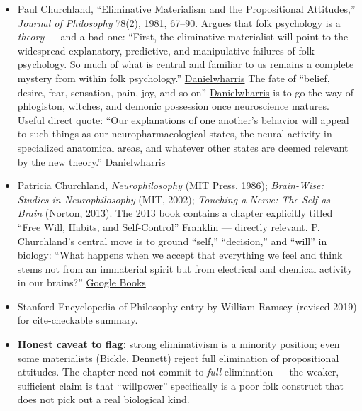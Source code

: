 \begin{itemize}
\tightlist
\item
  Paul Churchland, ``Eliminative Materialism and the Propositional Attitudes,'' \emph{Journal of Philosophy} 78(2), 1981, 67--90. Argues that folk psychology is a \emph{theory} --- and a bad one: ``First, the eliminative materialist will point to the widespread explanatory, predictive, and manipulative failures of folk psychology. So much of what is central and familiar to us remains a complete mystery from within folk psychology.'' \href{https://danielwharris.com/teaching/101/readings/Churchland.pdf}{Danielwharris} The fate of ``belief, desire, fear, sensation, pain, joy, and so on'' \href{https://danielwharris.com/teaching/101/readings/Churchland.pdf}{Danielwharris} is to go the way of phlogiston, witches, and demonic possession once neuroscience matures. Useful direct quote: ``Our explanations of one another's behavior will appeal to such things as our neuropharmacological states, the neural activity in specialized anatomical areas, and whatever other states are deemed relevant by the new theory.'' \href{https://danielwharris.com/teaching/101/readings/Churchland.pdf}{Danielwharris}
\item
  Patricia Churchland, \emph{Neurophilosophy} (MIT Press, 1986); \emph{Brain-Wise: Studies in Neurophilosophy} (MIT, 2002); \emph{Touching a Nerve: The Self as Brain} (Norton, 2013). The 2013 book contains a chapter explicitly titled ``Free Will, Habits, and Self-Control'' \href{https://franklin.library.upenn.edu/catalog/FRANKLIN_9960549203503681}{Franklin} --- directly relevant. P. Churchland's central move is to ground ``self,'' ``decision,'' and ``will'' in biology: ``What happens when we accept that everything we feel and think stems not from an immaterial spirit but from electrical and chemical activity in our brains?'' \href{https://books.google.com/books/about/Touching_a_Nerve.html?id=5QQSAAAAQBAJ}{Google Books}
\item
  Stanford Encyclopedia of Philosophy entry by William Ramsey (revised 2019) for cite-checkable summary.
\item
  \textbf{Honest caveat to flag:} strong eliminativism is a minority position; even some materialists (Bickle, Dennett) reject full elimination of propositional attitudes. The chapter need not commit to \emph{full} elimination --- the weaker, sufficient claim is that ``willpower'' specifically is a poor folk construct that does not pick out a real biological kind.
\end{itemize}

